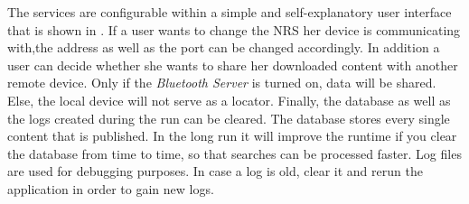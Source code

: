 The services are configurable within a simple and self-explanatory user interface that is shown in .
If a user wants to change the NRS her device is communicating with,the address as well as the port can be changed accordingly.
In addition a user can decide whether she wants to share her downloaded content with another remote device. Only if the \textit{Bluetooth Server} 
is turned on, data will be shared. Else, the local device will not serve as a locator.
Finally, the database as well as the logs created during the run can be cleared.
The database stores every single content that is published. In the long run it will improve the runtime if you clear the database from
time to time, so that searches can be processed faster.
Log files are used for debugging purposes. In case a log is old, clear it and rerun the application in order to 
gain new logs.





